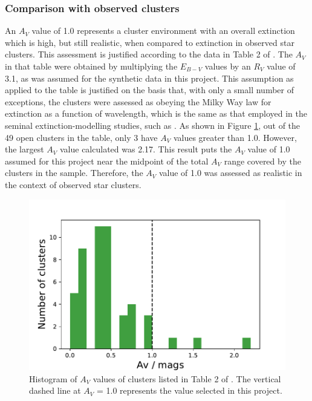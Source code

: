 \documentclass[12pt, a4paper]{report}
\begin{document}
\subsubsection{Comparison with observed clusters}

An $A_{V}$ value of 1.0 represents a cluster environment with an overall extinction which is high, but still realistic, when compared to extinction in observed star clusters. This assessment is justified according to the data in Table 2 of \cite{2019AJ....158...35S}. The $A_{V}$ in that table were obtained by multiplying the $E_{B-V}$ values by an $R_{V}$ value of 3.1, as was assumed for the synthetic data in this project. This assumption as applied to the table is justified on the basis that, with only a small number of exceptions, the clusters were assessed as obeying the Milky Way law for extinction as a function of wavelength, which is the same as that employed in the seminal extinction-modelling studies, such as \cite{1989ApJ...345..245C}. As shown in Figure \ref{siegel_Av_vals}, out of the 49 open clusters in the table, only 3 have $A_{V}$ values greater than 1.0. However, the largest $A_{V}$ value calculated was 2.17. This result puts the $A_{V}$ value of 1.0 assumed for this project near the midpoint of the total $A_{V}$ range covered by the clusters in the \cite{2019AJ....158...35S} sample. Therefore, the $A_{V}$ value of 1.0 was assessed as realistic in the context of observed star clusters.

\begin{figure}[h!]
\begin{center}
\includegraphics[width=1.0\textwidth]{../siegel_clusters_Av_vals_hist.pdf}
\caption{Histogram of $A_{V}$ values of clusters listed in Table 2 of \cite{2019AJ....158...35S}. The vertical dashed line at $A_{V}$ = 1.0 represents the value selected in this project.}
\label{siegel_Av_vals}
\end{center}
\end{figure}
\end{document}
